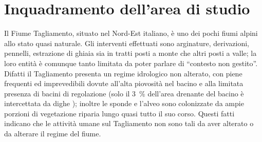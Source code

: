 

\section{Inquadramento dell'area di studio}
Il Fiume Tagliamento, situato nel Nord-Est italiano, è uno dei pochi fiumi alpini allo stato quasi naturale. 
Gli interventi effettuati sono arginature, derivazioni, pennelli, estrazione di ghiaia sia in tratti posti a monte che altri posti a valle; la loro entità è comunque tanto limitata da poter parlare di “contesto non gestito”.
Difatti il Tagliamento presenta un regime idrologico non alterato, con piene frequenti ed imprevedibili dovute all'alta piovosità nel bacino  e alla limitata presenza di bacini di regolazione (solo il \SI{3}{\percent} dell'area drenante del bacino è intercettata da dighe ); inoltre le sponde e l'alveo sono colonizzate da ampie porzioni di vegetazione riparia lungo quasi tutto il suo corso. 
Questi fatti indicano che le attività umane sul Tagliamento non sono tali da aver alterato o da alterare il regime del fiume.

